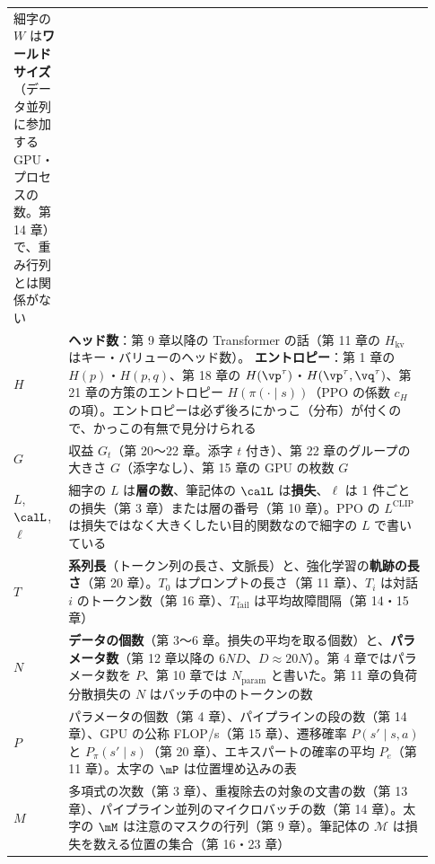 \begin{minipage}{\linewidth}
\begin{tabular}{>{\raggedright\arraybackslash}p{0.10\linewidth}>{\raggedright\arraybackslash}p{0.83\linewidth}}
細字の $W$ は\textbf{ワールドサイズ}（データ並列に参加する GPU・プロセスの数。第 14 章）で、重み行列とは関係がない \\
$H$ & \textbf{ヘッド数}：第 9 章以降の Transformer の話（第 11 章の $H_{\mathrm{kv}}$ はキー・バリューのヘッド数）。
\textbf{エントロピー}：第 1 章の $H(p)$・$H(p,q)$、第 18 章の $H(\vp^\tau)$・$H(\vp^\tau,\vq^\tau)$、第 21 章の方策のエントロピー $H(\pi(\cdot\mid s))$（PPO の係数 $c_H$ の項）。エントロピーは必ず後ろにかっこ（分布）が付くので、かっこの有無で見分けられる \\
$G$ & 収益 $G_t$（第 20〜22 章。添字 $t$ 付き）、第 22 章のグループの大きさ $G$（添字なし）、第 15 章の GPU の枚数 $G$ \\
$L$, $\calL$, $\ell$ & 細字の $L$ は\textbf{層の数}、筆記体の $\calL$ は\textbf{損失}、$\ell$ は 1 件ごとの損失（第 3 章）または層の番号（第 10 章）。PPO の $L^{\mathrm{CLIP}}$ は損失ではなく大きくしたい目的関数なので細字の $L$ で書いている \\
$T$ & \textbf{系列長}（トークン列の長さ、文脈長）と、強化学習の\textbf{軌跡の長さ}（第 20 章）。$T_0$ はプロンプトの長さ（第 11 章）、$T_i$ は対話 $i$ のトークン数（第 16 章）、$T_{\mathrm{fail}}$ は平均故障間隔（第 14・15 章） \\
$N$ & \textbf{データの個数}（第 3〜6 章。損失の平均を取る個数）と、\textbf{パラメータ数}（第 12 章以降の $6ND$、$D\approx20N$）。第 4 章ではパラメータ数を $P$、第 10 章では $N_{\text{param}}$ と書いた。第 11 章の負荷分散損失の $N$ はバッチの中のトークンの数 \\
$P$ & パラメータの個数（第 4 章）、パイプラインの段の数（第 14 章）、GPU の公称 FLOP/s（第 15 章）、遷移確率 $P(s'\mid s,a)$ と $P_\pi(s'\mid s)$（第 20 章）、エキスパートの確率の平均 $P_e$（第 11 章）。太字の $\mP$ は位置埋め込みの表 \\
$M$ & 多項式の次数（第 3 章）、重複除去の対象の文書の数（第 13 章）、パイプライン並列のマイクロバッチの数（第 14 章）。太字の $\mM$ は注意のマスクの行列（第 9 章）。筆記体の $\mathcal{M}$ は損失を数える位置の集合（第 16・23 章） \\
\bottomrule
\end{tabular}
\end{minipage}\par\medskip

